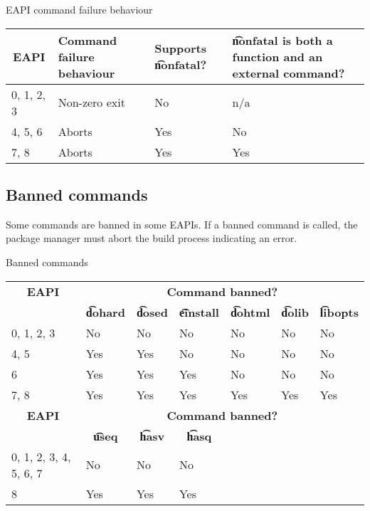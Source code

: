 \begin{centertable}{EAPI command failure behaviour}
    \label{tab:commands-die-table}
    \begin{tabular}{llll}
      \toprule
      \multicolumn{1}{c}{\textbf{EAPI}} &
      \multicolumn{1}{P{8em}}{\textbf{Command failure behaviour}} &
      \multicolumn{1}{P{5em}}{\textbf{Supports \t{nonfatal}?}} &
      \multicolumn{1}{P{12em}}{\textbf{\t{nonfatal} is both a function and an external command?}} \\
      \midrule
      0, 1, 2, 3        & Non-zero exit & No  & n/a \\
      4, 5, 6           & Aborts        & Yes & No  \\
      7, 8              & Aborts        & Yes & Yes \\
      \bottomrule
    \end{tabular}
\end{centertable}

\subsection{Banned commands}
\label{sec:banned-commands}

 Some commands are banned in some EAPIs. If a banned command is
called, the package manager must abort the build process indicating an error.

\begin{centertable}{Banned commands}
    \label{tab:banned-commands-table}
    \begin{tabular}{lllllll}
      \toprule
      \multicolumn{1}{c}{\textbf{EAPI}} &
      \multicolumn{6}{c}{\textbf{Command banned?}} \\
      \multicolumn{1}{c}{} &
      \multicolumn{1}{c}{\textbf{\t{dohard}}} &
      \multicolumn{1}{c}{\textbf{\t{dosed}}} &
      \multicolumn{1}{c}{\textbf{\t{einstall}}} &
      \multicolumn{1}{c}{\textbf{\t{dohtml}}} &
      \multicolumn{1}{c}{\textbf{\t{dolib}}} &
      \multicolumn{1}{c}{\textbf{\t{libopts}}} \\
      \midrule
      0, 1, 2, 3        & No  & No  & No  & No  & No  & No  \\
      4, 5              & Yes & Yes & No  & No  & No  & No  \\
      6                 & Yes & Yes & Yes & No  & No  & No  \\
      7, 8              & Yes & Yes & Yes & Yes & Yes & Yes \\
      \midrule
      \multicolumn{1}{c}{\textbf{EAPI}} &
      \multicolumn{6}{c}{\textbf{Command banned?}} \\
      \multicolumn{1}{c}{} &
      \multicolumn{1}{c}{\textbf{\t{useq}}} &
      \multicolumn{1}{c}{\textbf{\t{hasv}}} &
      \multicolumn{1}{c}{\textbf{\t{hasq}}} & & & \\
      \midrule
      0, 1, 2, 3, 4, 5, 6, 7  & No  & No  & No  & & & \\
      8                       & Yes & Yes & Yes & & & \\
      \bottomrule
    \end{tabular}
\end{centertable}

